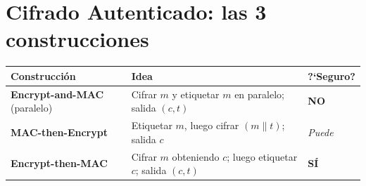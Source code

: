 \documentclass[11pt,a4paper]{article}
\begin{document}
\section{Cifrado Autenticado: las 3 construcciones}

\begin{center}
\renewcommand{\arraystretch}{1.3}
\begin{tabular}{p{4.4cm}p{6cm}p{2.4cm}}
\toprule
\textbf{Construcci\'on}        & \textbf{Idea}                              & \textbf{?`Seguro?} \\
\midrule
\textbf{Encrypt-and-MAC} (paralelo) &
  Cifrar $m$ y etiquetar $m$ en paralelo; salida $(c,t)$         & \textbf{NO} \\
\textbf{MAC-then-Encrypt}           &
  Etiquetar $m$, luego cifrar $(m\|t)$; salida $c$               & \emph{Puede} \\
\textbf{Encrypt-then-MAC}           &
  Cifrar $m$ obteniendo $c$; luego etiquetar $c$; salida $(c,t)$ & \textbf{S\'I} \\
\bottomrule
\end{tabular}
\end{center}
\end{document}
